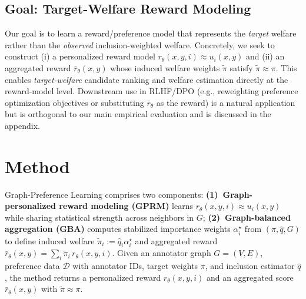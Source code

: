 \documentclass{article}
\theoremstyle{plain}
\theoremstyle{definition}
\theoremstyle{remark}
\begin{document}
\subsection{Goal: Target-Welfare Reward Modeling}
\label{subsec:goal}

Our goal is to learn a reward/preference model that represents the
\emph{target} welfare rather than the \emph{observed} inclusion-weighted welfare.
Concretely, we seek to construct (i) a personalized reward model
$r_\theta(x,y,i)\approx u_i(x,y)$ and (ii) an aggregated reward
$\bar r_\theta(x,y)$ whose induced welfare weights $\tilde\pi$ satisfy
$\tilde\pi\approx \pi$.
This enables \emph{target-welfare} candidate ranking and welfare estimation
directly at the reward-model level. Downstream use in RLHF/DPO (e.g., reweighting
preference optimization objectives or substituting $\bar r_\theta$ as the reward)
is a natural application but is orthogonal to our main empirical evaluation and
is discussed in the appendix.



\section{Method}
\label{sec:method}

Graph-Preference Learning comprises two components: \textbf{(1)~Graph-personalized reward modeling (GPRM)} learns $r_\theta(x,y,i)\approx u_i(x,y)$ while sharing statistical strength across neighbors in $G$; \textbf{(2)~Graph-balanced aggregation (GBA)} computes stabilized importance weights $\alpha_i^\star$ from $(\pi,\hat q,G)$ to define induced welfare $\tilde\pi_i := \hat q_i \alpha_i^\star$ and aggregated reward $\bar r_\theta(x,y)=\sum_i\tilde\pi_i\, r_\theta(x,y,i)$. Given an annotator graph $G=(V,E)$, preference data $\mathcal{D}$ with annotator IDs, target weights $\pi$, and inclusion estimator $\hat q$, the method returns a personalized reward $r_\theta(x,y,i)$ and an aggregated score $\bar r_\theta(x,y)$ with $\tilde\pi \approx \pi$.
\end{document}
